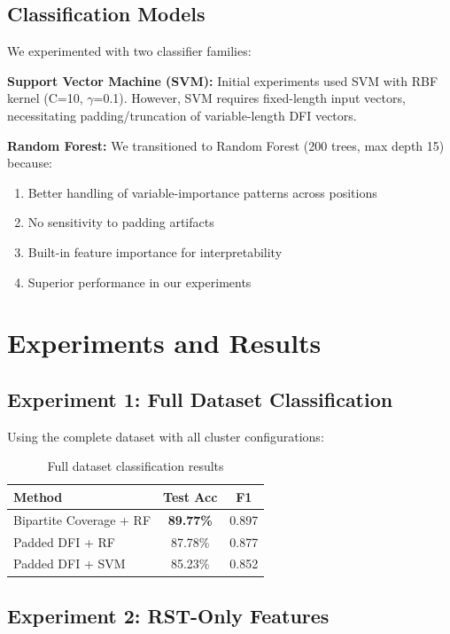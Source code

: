 \documentclass[11pt]{article}
\begin{document}
\subsection{Classification Models}

We experimented with two classifier families:

\textbf{Support Vector Machine (SVM):} Initial experiments used SVM with RBF kernel (C=10, $\gamma$=0.1). However, SVM requires fixed-length input vectors, necessitating padding/truncation of variable-length DFI vectors.

\textbf{Random Forest:} We transitioned to Random Forest (200 trees, max depth 15) because:
\begin{enumerate}
    \item Better handling of variable-importance patterns across positions
    \item No sensitivity to padding artifacts
    \item Built-in feature importance for interpretability
    \item Superior performance in our experiments
\end{enumerate}

\section{Experiments and Results}

\subsection{Experiment 1: Full Dataset Classification}

Using the complete dataset with all cluster configurations:

\begin{table}[h]
\centering
\begin{tabular}{lcc}
\toprule
\textbf{Method} & \textbf{Test Acc} & \textbf{F1} \\
\midrule
Bipartite Coverage + RF & \textbf{89.77\%} & 0.897 \\
Padded DFI + RF & 87.78\% & 0.877 \\
Padded DFI + SVM & 85.23\% & 0.852 \\
\bottomrule
\end{tabular}
\caption{Full dataset classification results}
\label{tab:full-results}
\end{table}

\subsection{Experiment 2: RST-Only Features}
\end{document}
